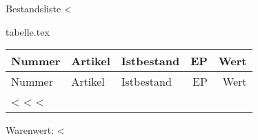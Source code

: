 \documentclass[a4paper,foldmarks=true]{scrartcl}
\begin{document}
\fontsize{12}{15pt plus 0.15pt minus 0.1pt}\selectfont
Bestandsliste <%

\begin{filecontents}{tabelle.tex}

\begin{longtable}{@{}lXp{70px}rr@{}} %
        Nummer & Artikel & Istbestand & EP & Wert \\
	\hline %
    \endfirsthead

        Nummer & Artikel & Istbestand & EP & Wert \\
	\hline %
    \endhead

  \endfoot

	\hline %
  \endlastfoot

	<%
            <%
	<%

	\hline
\end{longtable}
\end{filecontents}
Warenwert: <%
\vspace{5mm}

\label{LastPage}
\end{document}
